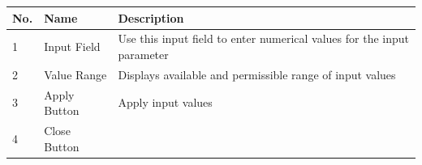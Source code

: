 \begin{longtable}[]{@{}|l|l|l|@{}}
\toprule
\rowcolor{brown}\begin{minipage}[b]{0.04\columnwidth}\raggedright
{\bf{No.}}\strut
\end{minipage} & \begin{minipage}[b]{0.23\columnwidth}\raggedright
{\bf{Name}}\strut
\end{minipage} & \begin{minipage}[b]{0.65\columnwidth}\raggedright
{\bf{Description}}\strut
\end{minipage}\tabularnewline
\midrule
\endhead
\begin{minipage}[t]{0.04\columnwidth}\raggedright
1\strut
\end{minipage} & \begin{minipage}[t]{0.23\columnwidth}\raggedright
Input Field\strut
\end{minipage} & \begin{minipage}[t]{0.65\columnwidth}\raggedright
Use this input field to enter numerical values for the input
parameter\strut
\end{minipage}\tabularnewline
\begin{minipage}[t]{0.04\columnwidth}\raggedright
2\strut
\end{minipage} & \begin{minipage}[t]{0.23\columnwidth}\raggedright
Value Range\strut
\end{minipage} & \begin{minipage}[t]{0.65\columnwidth}\raggedright
Displays available and permissible range of input values\strut
\end{minipage}\tabularnewline
\begin{minipage}[t]{0.04\columnwidth}\raggedright
3\strut
\end{minipage} & \begin{minipage}[t]{0.23\columnwidth}\raggedright
Apply Button\strut
\end{minipage} & \begin{minipage}[t]{0.65\columnwidth}\raggedright
Apply input values\strut
\end{minipage}\tabularnewline
\begin{minipage}[t]{0.04\columnwidth}\raggedright
4\strut
\end{minipage} & \begin{minipage}[t]{0.23\columnwidth}\raggedright
Close Button\strut
\end{minipage} & \begin{minipage}[t]{0.65\columnwidth}\raggedright

\end{minipage}
\end{longtable}
